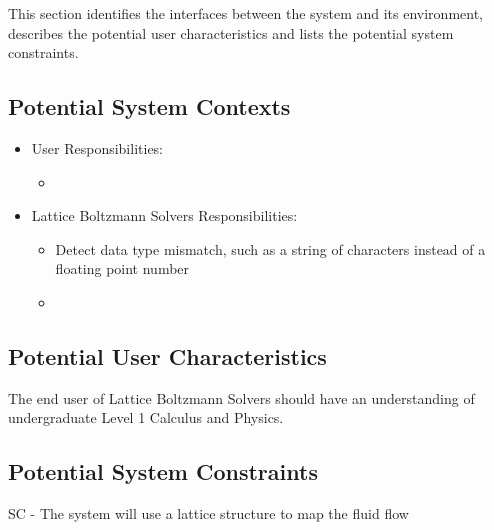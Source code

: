 \documentclass[12pt]{article}
\newcommand{\famname}{Lattice Boltzmann Solvers} %
\begin{document}
This section identifies the interfaces between the system and its environment,
describes the potential user characteristics and lists the potential system
constraints.

\subsection{Potential System Contexts}


\begin{itemize}
\item User Responsibilities:
\begin{itemize}
\item 
\end{itemize}
\item \famname{} Responsibilities:
\begin{itemize}
\item Detect data type mismatch, such as a string of characters instead of a
  floating point number
\item 
\end{itemize}
\end{itemize}

\subsection{Potential User Characteristics} \label{SecUserCharacteristics}

The end user of \famname{} should have an understanding of undergraduate Level
1 Calculus and Physics.

\subsection{Potential System Constraints}

SC - The system will use a lattice structure to map the fluid flow



\end{document}
